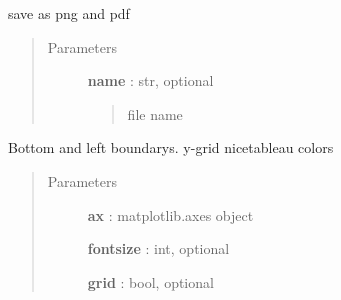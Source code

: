 \documentclass[letterpaper,10pt,english]{sphinxmanual}
\begin{document}

\begin{fulllineitems}
\label{pubplots:pubplots.plot.save}
save as png and pdf
\begin{quote}\begin{description}
\item[{Parameters}] \leavevmode
\textbf{name} : str, optional
\begin{quote}

file name
\end{quote}

\end{description}\end{quote}

\end{fulllineitems}


\begin{fulllineitems}
\label{pubplots:pubplots.plot.semi_modern_style}
Bottom and left boundarys. y-grid nicetableau colors
\begin{quote}\begin{description}
\item[{Parameters}] \leavevmode
\textbf{ax} : matplotlib.axes object

\textbf{fontsize} : int, optional

\textbf{grid} : bool, optional

\end{description}\end{quote}

\end{fulllineitems}

\end{document}
